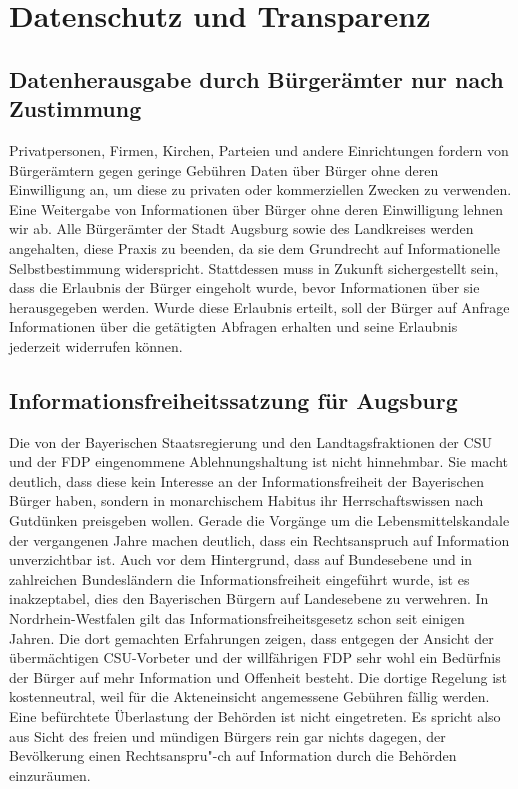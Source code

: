 \chapter{Datenschutz und Transparenz}

  \section{Datenherausgabe durch Bürgerämter nur nach Zustimmung}
  
  Privatpersonen, Firmen, Kirchen, Parteien und andere Einrichtungen fordern 
  von Bürgerämtern gegen geringe Gebühren Daten über Bürger ohne deren 
  Einwilligung an, um diese zu privaten oder kommerziellen Zwecken zu 
  verwenden. Eine Weitergabe von Informationen über Bürger ohne deren 
  Einwilligung lehnen wir ab. Alle Bürgerämter der Stadt Augsburg sowie des 
  Landkreises werden angehalten, diese Praxis zu beenden, da sie dem 
  Grundrecht auf Informationelle Selbstbestimmung widerspricht. Stattdessen 
  muss in Zukunft sichergestellt sein, dass die Erlaubnis der Bürger eingeholt 
  wurde, bevor Informationen über sie herausgegeben werden. Wurde diese 
  Erlaubnis erteilt, soll der Bürger auf Anfrage Informationen über die 
  getätigten Abfragen erhalten und seine Erlaubnis jederzeit widerrufen 
  können. 
  
  \section{Informationsfreiheitssatzung für Augsburg}
  
  Die von der Bayerischen Staatsregierung und den Landtagsfraktionen der CSU 
  und der FDP eingenommene Ablehnungshaltung ist nicht hinnehmbar. Sie macht 
  deutlich, dass diese kein Interesse an der Informationsfreiheit der 
  Bayerischen Bürger haben, sondern in monarchischem Habitus ihr 
  Herrschaftswissen nach Gutdünken preisgeben wollen. Gerade die Vorgänge um 
  die Lebensmittelskandale der vergangenen Jahre machen deutlich, dass ein 
  Rechtsanspruch auf Information unverzichtbar ist. Auch vor dem Hintergrund, 
  dass auf Bundesebene und in zahlreichen Bundesländern die 
  Informationsfreiheit eingeführt wurde, ist es inakzeptabel, dies den 
  Bayerischen Bürgern auf Landesebene zu verwehren. In Nordrhein-Westfalen 
  gilt das Informationsfreiheitsgesetz schon seit einigen Jahren. Die dort 
  gemachten Erfahrungen zeigen, dass entgegen der Ansicht der übermächtigen 
  CSU-Vorbeter und der willfährigen FDP sehr wohl ein Bedürfnis der Bürger auf 
  mehr Information und Offenheit besteht. Die dortige Regelung ist 
  kostenneutral, weil für die Akteneinsicht angemessene Gebühren fällig 
  werden. Eine befürchtete Überlastung der Behörden ist nicht eingetreten. Es 
  spricht also aus Sicht des freien und mündigen Bürgers rein gar nichts 
  dagegen, der Bevölkerung einen Rechtsanspru"-ch auf Information durch die 
  Behörden einzuräumen.
  
